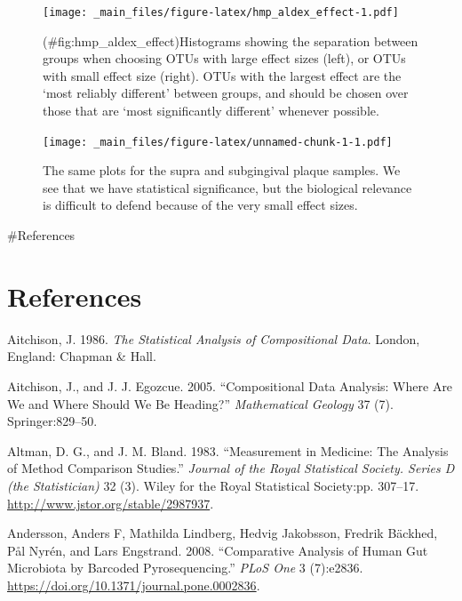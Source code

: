 \documentclass[onecolumn]{book}
\theoremstyle{definition}
\theoremstyle{definition}
\theoremstyle{definition}
\theoremstyle{remark}
\begin{document}
\begin{figure}
\centering
\texttt{[image: \_main\_files/figure-latex/hmp\_aldex\_effect-1.pdf]}
\caption{(\#fig:hmp\_aldex\_effect)Histograms showing the separation
between groups when choosing OTUs with large effect sizes (left), or
OTUs with small effect size (right). OTUs with the largest effect are
the `most reliably different' between groups, and should be chosen over
those that are `most significantly different' whenever possible.}
\end{figure}

\newpage

\begin{figure}
\centering
\texttt{[image: \_main\_files/figure-latex/unnamed-chunk-1-1.pdf]}
\caption{\label{fig:unnamed-chunk-1}The same plots for the supra and
subgingival plaque samples. We see that we have statistical
significance, but the biological relevance is difficult to defend
because of the very small effect sizes.}
\end{figure}

\newpage

\#References

\hypertarget{references}{%
\chapter{References}\label{references}}

\hypertarget{refs}{}
\leavevmode\hypertarget{ref-Aitchison:1986}{}%
Aitchison, J. 1986. \emph{The Statistical Analysis of Compositional
Data}. London, England: Chapman \& Hall.

\leavevmode\hypertarget{ref-aitchison:2005}{}%
Aitchison, J., and J. J. Egozcue. 2005. ``Compositional Data Analysis:
Where Are We and Where Should We Be Heading?'' \emph{Mathematical
Geology} 37 (7). Springer:829--50.

\leavevmode\hypertarget{ref-altman:1983}{}%
Altman, D. G., and J. M. Bland. 1983. ``Measurement in Medicine: The
Analysis of Method Comparison Studies.'' \emph{Journal of the Royal
Statistical Society. Series D (the Statistician)} 32 (3). Wiley for the
Royal Statistical Society:pp. 307--17.
\url{http://www.jstor.org/stable/2987937}.

\leavevmode\hypertarget{ref-Andersson:2008}{}%
Andersson, Anders F, Mathilda Lindberg, Hedvig Jakobsson, Fredrik
Bäckhed, Pål Nyrén, and Lars Engstrand. 2008. ``Comparative Analysis of
Human Gut Microbiota by Barcoded Pyrosequencing.'' \emph{PLoS One} 3
(7):e2836. \url{https://doi.org/10.1371/journal.pone.0002836}.
\end{document}
